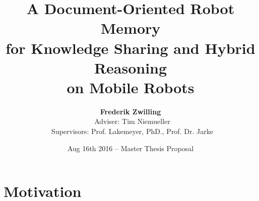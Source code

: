 



\usepackage{todonotes}
\usepackage{booktabs}
\newcommand{\tabitem}{~~\llap{\textcolor{FawkesOrange}{\textbullet}}~~}


\title[Robot Memory] {A Document-Oriented Robot Memory\\ for
  Knowledge Sharing and Hybrid Reasoning\\ on Mobile Robots}
\author[Zwilling]{
  \textbf{Frederik Zwilling}\\
  ~Adviser: Tim Niemueller\\
  ~Supervisors: Prof. Lakemeyer, PhD., Prof. Dr. Jarke
}
\def\projecturl{}

\date[Aug 16th 2016]{Aug 16th 2016 -- Master Thesis Proposal}



\frame[plain]{\titlepage}
\addtocounter{framenumber}{-1}

\section{Motivation}

